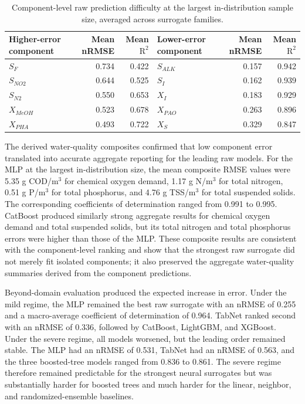 \documentclass[12pt, twoside]{book}
\begin{document}
\begin{table}[htbp]
\centering
\caption{Component-level raw prediction difficulty at the largest in-distribution sample size, averaged across surrogate families.}
\label{tab:ch1_component_patterns}
\scriptsize
\setlength{\tabcolsep}{6pt}
\begin{tabular}{lrrlrr}
\toprule
Higher-error component & Mean nRMSE & Mean \(\mathrm{R}^{2}\) & Lower-error component & Mean nRMSE & Mean \(\mathrm{R}^{2}\) \\
\midrule
\(S_F\) & 0.734 & 0.422 & \(S_{ALK}\) & 0.157 & 0.942 \\
\(S_{NO2}\) & 0.644 & 0.525 & \(S_I\) & 0.162 & 0.939 \\
\(S_{N2}\) & 0.550 & 0.653 & \(X_I\) & 0.183 & 0.929 \\
\(X_{MeOH}\) & 0.523 & 0.678 & \(X_{PAO}\) & 0.263 & 0.896 \\
\(X_{PHA}\) & 0.493 & 0.722 & \(X_S\) & 0.329 & 0.847 \\
\bottomrule
\end{tabular}
\end{table}

The derived water-quality composites confirmed that low component error translated into accurate aggregate
reporting for the leading raw models. For the MLP at the largest in-distribution size, the mean composite
RMSE values were 5.35 g COD/m\(^3\) for chemical oxygen demand, 1.17 g N/m\(^3\) for total nitrogen, 0.51 g
P/m\(^3\) for total phosphorus, and 4.76 g TSS/m\(^3\) for total suspended solids. The corresponding
coefficients of determination ranged from 0.991 to 0.995. CatBoost produced similarly strong aggregate
results for chemical oxygen demand and total suspended solids, but its total nitrogen and total phosphorus
errors were higher than those of the MLP. These composite results are consistent with the component-level
ranking and show that the strongest raw surrogate did not merely fit isolated components; it also preserved
the aggregate water-quality summaries derived from the component predictions.

Beyond-domain evaluation produced the expected increase in error. Under the mild regime, the MLP remained the
best raw surrogate with an nRMSE of 0.255 and a macro-average coefficient of determination of 0.964. TabNet
ranked second with an nRMSE of 0.336, followed by CatBoost, LightGBM, and XGBoost. Under the severe regime,
all models worsened, but the leading order remained stable. The MLP had an nRMSE of 0.531, TabNet had an
nRMSE of 0.563, and the three boosted-tree models ranged from 0.836 to 0.861. The severe regime therefore
remained predictable for the strongest neural surrogates but was substantially harder for boosted trees and
much harder for the linear, neighbor, and randomized-ensemble baselines.
\end{document}
